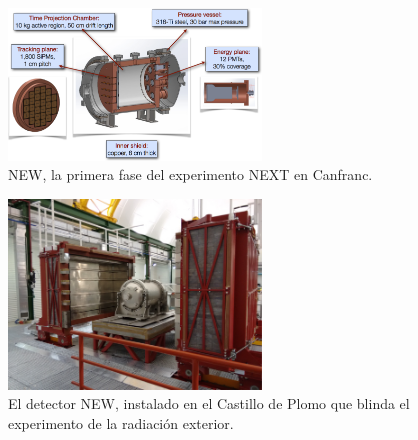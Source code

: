 \begin{figure}
\centering
\includegraphics[width=0.6\textwidth]{img/NEW.png}
\caption{\small NEW, la primera fase del experimento NEXT en Canfranc.} \label{fig:NEW}
\end{figure} 

\begin{figure}
\centering
\includegraphics[width=0.6\textwidth]{img/NewCastle.png}
\caption{\small El detector NEW, instalado en el Castillo de Plomo que blinda el experimento de la radiación exterior.} \label{fig.NewCastle}
\end{figure} 

